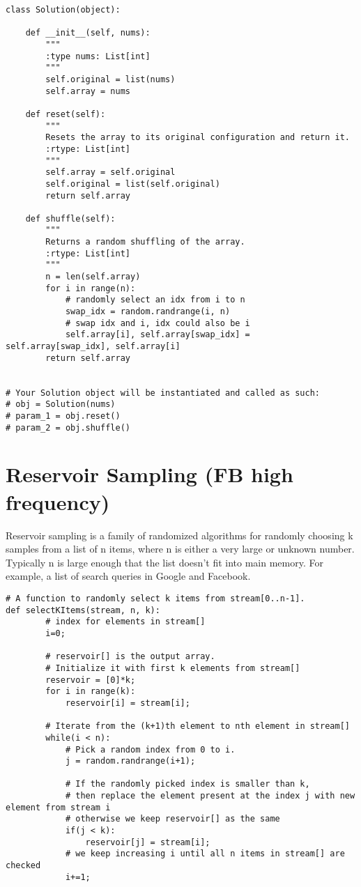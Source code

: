 \begin{lstlisting}
class Solution(object):

    def __init__(self, nums):
        """
        :type nums: List[int]
        """
        self.original = list(nums)
        self.array = nums

    def reset(self):
        """
        Resets the array to its original configuration and return it.
        :rtype: List[int]
        """
        self.array = self.original
        self.original = list(self.original)
        return self.array

    def shuffle(self):
        """
        Returns a random shuffling of the array.
        :rtype: List[int]
        """
        n = len(self.array)
        for i in range(n):
            # randomly select an idx from i to n
            swap_idx = random.randrange(i, n)
            # swap idx and i, idx could also be i
            self.array[i], self.array[swap_idx] = self.array[swap_idx], self.array[i]
        return self.array


# Your Solution object will be instantiated and called as such:
# obj = Solution(nums)
# param_1 = obj.reset()
# param_2 = obj.shuffle()
\end{lstlisting}

\section{Reservoir Sampling (FB high frequency)}
Reservoir sampling is a family of randomized algorithms for randomly choosing k samples from a list of n items, where n is either a very large or unknown number. Typically n is large enough that the list doesn’t fit into main memory. For example, a list of search queries in Google and Facebook.

\begin{lstlisting}
# A function to randomly select k items from stream[0..n-1]. 
def selectKItems(stream, n, k): 
        # index for elements in stream[] 
        i=0;  
          
        # reservoir[] is the output array. 
        # Initialize it with first k elements from stream[] 
        reservoir = [0]*k; 
        for i in range(k): 
            reservoir[i] = stream[i]; 
          
        # Iterate from the (k+1)th element to nth element in stream[]
        while(i < n): 
            # Pick a random index from 0 to i. 
            j = random.randrange(i+1); 
              
            # If the randomly picked index is smaller than k, 
            # then replace the element present at the index j with new element from stream i
            # otherwise we keep reservoir[] as the same
            if(j < k): 
                reservoir[j] = stream[i]; 
            # we keep increasing i until all n items in stream[] are checked
            i+=1; 
\end{lstlisting}
